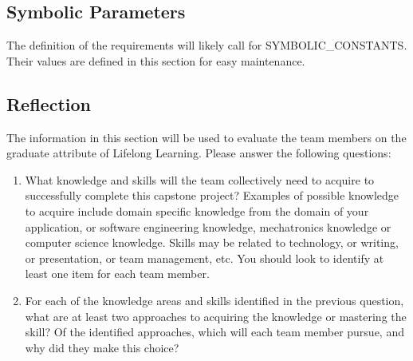 \documentclass[12pt]{article}
\begin{document}
\subsection{Symbolic Parameters}

The definition of the requirements will likely call for SYMBOLIC\_CONSTANTS.
Their values are defined in this section for easy maintenance.

\subsection{Reflection}

The information in this section will be used to evaluate the team members on the
graduate attribute of Lifelong Learning.  Please answer the following questions:

\begin{enumerate}
  \item What knowledge and skills will the team collectively need to acquire to
  successfully complete this capstone project?  Examples of possible knowledge
  to acquire include domain specific knowledge from the domain of your
  application, or software engineering knowledge, mechatronics knowledge or
  computer science knowledge.  Skills may be related to technology, or writing,
  or presentation, or team management, etc.  You should look to identify at
  least one item for each team member.
  \item For each of the knowledge areas and skills identified in the previous
  question, what are at least two approaches to acquiring the knowledge or
  mastering the skill?  Of the identified approaches, which will each team
  member pursue, and why did they make this choice?
\end{enumerate}
\end{document}
